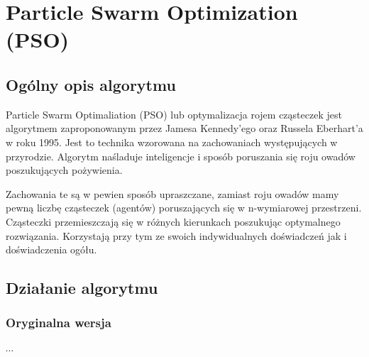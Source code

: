 
\section{Particle Swarm Optimization (PSO)}
\author{Paweł Jastrzębski}
\subsection{Ogólny opis algorytmu}
\par Particle Swarm Optimaliation (PSO) lub optymalizacja rojem cząsteczek jest algorytmem zaproponowanym przez Jamesa Kennedy'ego oraz Russela Eberhart'a w roku 1995. Jest to technika wzorowana na zachowaniach występujących w przyrodzie. Algorytm naśladuje inteligencje i sposób poruszania się roju owadów poszukujących pożywienia. 
\par Zachowania te są w pewien sposób upraszczane, zamiast roju owadów mamy pewną liczbę cząsteczek (agentów) poruszających się w n-wymiarowej przestrzeni. Cząsteczki przemieszczają się w różnych kierunkach poszukując optymalnego rozwiązania. Korzystają przy tym ze swoich indywidualnych doświadczeń jak i doświadczenia ogółu.
\subsection{Działanie algorytmu}
\subsubsection{Oryginalna wersja}
$\cdots$
